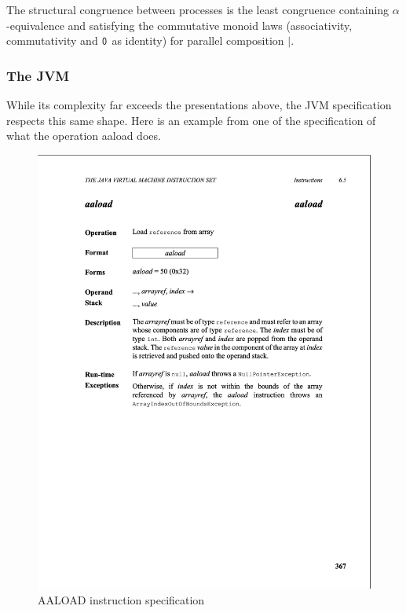 The structural congruence between processes is the least congruence
containing $\alpha$-equivalence and satisfying the commutative monoid
laws (associativity, commutativity and $\mathsf{0}$ as identity) for
parallel composition $|$.


\subsubsection{The JVM}

While its complexity far exceeds the presentations above, the JVM specification respects this same shape. Here is an example from one of the specification of what the operation aaload does.

\begin{figure}[h!]
  \includegraphics[width=\linewidth]{JVMSpecAALOAD.jpg}
  \caption{AALOAD instruction specification}
  \label{fig:AALOADSpec}
\end{figure}
